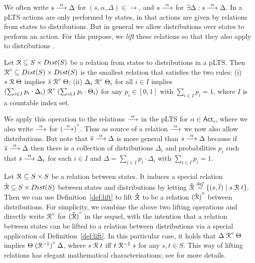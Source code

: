 \documentclass[a4paper,UKenglish,cleveref, autoref]{lipics-v2019}
\newcommand{\define}{\stackrel{\it def}=}
\newcommand{\dist}[1]{\mathop{Dist} ({#1})   } %
\newcommand{\pdist}[1]{\overline{#1}  } %
\newcommand{\lift}[1]{\mathrel{{#1}^\circ}}
\newcommand{\Act}{\ensuremath{\mathsf{Act}}\xspace}
\begin{document}
We often write $s\mathrel{\stackrel{\alpha}{\longrightarrow}}\Delta$ for $(s,\alpha,\Delta)\in\rightarrow$, and $s\mathrel{\stackrel{\alpha}{\longrightarrow}}$ for $\exists \Delta: s\mathrel{\stackrel{\alpha}{\longrightarrow}}\Delta$.
In a pLTS actions are only performed by states, in that actions are
given by relations from states to distributions. But in general we
allow distributions over states to perform an action. For this
purpose, we \emph{lift} these relations so that they also apply to
distributions \cite{DGHM09}.
\begin{definition}\label{def:lift}
	Let  $\mathord{\aRel} \subseteq
	S\times\dist{S}$ be a relation from states to distributions in a pLTS.
	Then $\mathord{\lift{\aRel}} \subseteq \dist{S} \times
	\dist{S}$ is the smallest relation that satisfies the two rules:
	(i) $s \mathrel{{\mathcal R }} \Theta$ implies $\pdist{s} \lift{\aRel} \Theta$;
	(ii) $\Delta_i \lift{\aRel} \Theta_i$ for all $i\in I$ implies
	$(\sum_{i\in I}p_i\cdot\Delta_i)\lift{\aRel}(\sum_{i\in I}p_i\cdot\Theta_i)$
	for any $p_i \in [0,1]$ with $\sum_{i\in I}p_i = 1$, where $I$ is a
	countable index set.
\end{definition}
\noindent

We apply this operation to the relations  $\mathrel{\stackrel{\alpha}{\longrightarrow}}$ in the pLTS
for $\alpha\in \Act_{\tau}$, where we also write $\mathrel{\stackrel{\alpha}{\longrightarrow}}$ for
$\lift{(\ar{\alpha})}$. Thus as source of
a relation $\mathrel{\stackrel{\alpha}{\longrightarrow}}$ we now also allow distributions.
But note that  $\pdist{s} \ar{\alpha} \Delta$ is more general than
$s \mathrel{\stackrel{\alpha}{\longrightarrow}} \Delta$ because if
$\pdist{s}\ar{\alpha}\Delta$ then there is a collection of distributions
$\Delta_i$ and probabilities $p_i$ such that $s\mathrel{\stackrel{\alpha}{\longrightarrow}}\Delta_i$ for each $i\in I$ and
$\Delta=\sum_{i\in I}p_i\cdot\Delta_i$ with $\sum_{i\in I}p_i=1$.

Let $\mathrel{{\mathcal R }}\ \subseteq S \times S$ be a relation between states. It induces a special relation $\hat{\aRel}\subseteq S\times\dist{S}$ between states and distributions by letting
$\hat{\aRel} \define \sset{(s,\pdist{t})\mid s\aRel t}.$
Then we can use Definition~\ref{def:lift} to lift $\hat{\mathrel{{\mathcal R }}}$ to be a relation $\lift{(\hat{\aRel})}$ between distributions. For simplicity, we combine the above two lifting operations and directly write $\lift{\aRel}$ for $\lift{(\hat{\aRel})}$ in the sequel, with the intention that a relation between states can be lifted to a relation between distributions via a special application of Definition~\ref{def:lift}. In this particular case, it holds that $\Delta \lift{\aRel} \Theta$ implies $\Theta \lift{(\aRel^{-1})}\Delta$, where $s \mathrel{{\mathcal R }} t$ iff $t\mathrel{{\mathcal R }}^{-1} s$ for any $s,t\in S$. This way of lifting relations has elegant mathematical characterisations; see \cite{Deng15} %
for more details.
\end{document}

